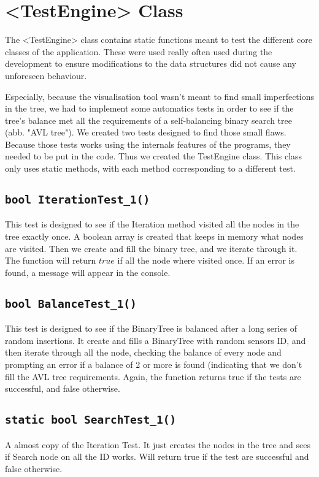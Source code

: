 \documentclass[10pt]{article}
\begin{document}
\section{<TestEngine> Class}
The <TestEngine> class contains static functions meant to test the different core classes of the application. These were used really often used during the development to ensure modifications to the data structures did not cause any unforeseen behaviour.

Especially, because the visualisation tool wasn't meant to find small imperfections in the tree, we had to implement some automatics tests in order to see if the tree's balance met all the requirements of a self-balancing binary search tree (abb. "AVL tree"). We created two tests designed to find those small flaws. Because those tests works using the internals features of the programs, they needed to be put in the code. Thus we created the TestEngine class. This class only uses static methods, with each method corresponding to a different test.

\subsection{\tt bool IterationTest\_1()}
This test is designed to see if the Iteration method visited all the nodes in the tree exactly once. A boolean array is created that keeps in memory what nodes are visited. Then we create and fill the binary tree, and we iterate through it. The function will return $true$ if all the node where visited once. If an error is found, a message will appear in the console.

\subsection{\tt bool BalanceTest\_1()}
This test is designed to see if the BinaryTree is balanced after a long series of random insertions. It create and fills a BinaryTree with random sensors ID, and then iterate through all the node, checking the balance of every node and prompting an error if a balance of 2 or more is found (indicating that we don't fill the AVL tree requirements. Again, the function returns true if the tests are successful, and false otherwise.

\subsection{\tt static bool SearchTest\_1()}
A almost copy of the Iteration Test. It just creates the nodes in the tree and sees if Search node on all the ID works. Will return true if the test are successful and false otherwise.
\end{document}
